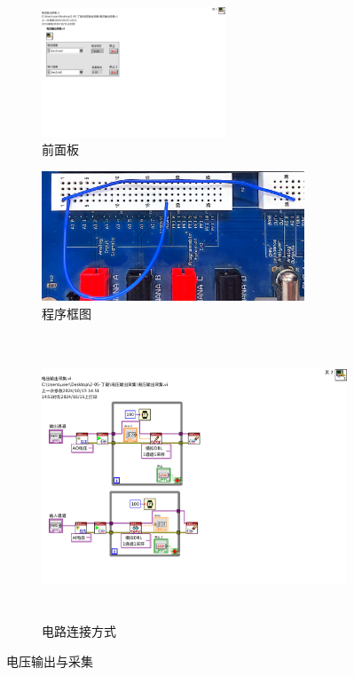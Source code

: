 \documentclass[UTF8]{article}
\theoremstyle{MyLineTheoremStyle} %
\theoremstyle{MyBlockTheoremStyle} %
\theoremstyle{MySubsubsectionStyle} %
\begin{document}
\begin{figure}[H]\centering
    \begin{minipage}[t]{0.48\textwidth}
        \centering
        \begin{subfigure}[b]{\textwidth}
            \centering
            \includegraphics[height=110pt]{assets/电压输出采集__面板.pdf}
            \caption{前面板}
        \end{subfigure}
        \vfill
        \begin{subfigure}[b]{\textwidth}
            \centering
            \includegraphics[height=110pt]{assets/电压输出与采集.jpg}
            \caption{程序框图}
        \end{subfigure}
    \end{minipage}
    \hfill
    \begin{minipage}[H]{0.48\textwidth}
        \centering
        \begin{subfigure}[b]{\textwidth}
            \centering
            \includegraphics[height=240pt]{assets/电压输出采集__框图.pdf}
            \caption{电路连接方式}
        \end{subfigure}
    \end{minipage}
    \caption{电压输出与采集}
    \label{电压输出与采集}
\end{figure}
\end{document}
